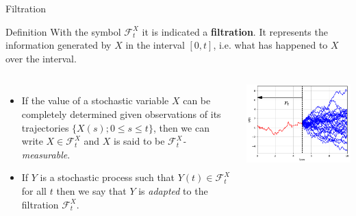 \documentclass{beamer}
\begin{document}
\begin{frame}{Filtration}
	\begin{block}{Definition}
		With the symbol $\mathcal{F}^X_t$ it is indicated a \textbf{filtration}. It represents the information generated by $X$ in the interval $[0, t]$, i.e. what has happened to $X$ over the interval. 
	\end{block}
    \begin{columns}
	\begin{itemize}	
		\item If the value of a stochastic variable $X$ can be completely determined given observations of its trajectories $\{X(s); 0\leq s \leq t\}$, then we can write $X\in\mathcal{F}_t^X$ and $X$ is said to be $\mathcal{F}_t^X$\emph{-measurable}.
		\item If $Y$ is a stochastic process such that $Y(t)\in\mathcal{F}_t^X$ for all $t$ then we say that $Y$ is \emph{adapted} to the filtration $\mathcal{F}_t^X$. 
	\end{itemize}
    \includegraphics[width=0.95\linewidth]{images/filtration.png}
    \end{columns}
\end{frame}
\end{document}
